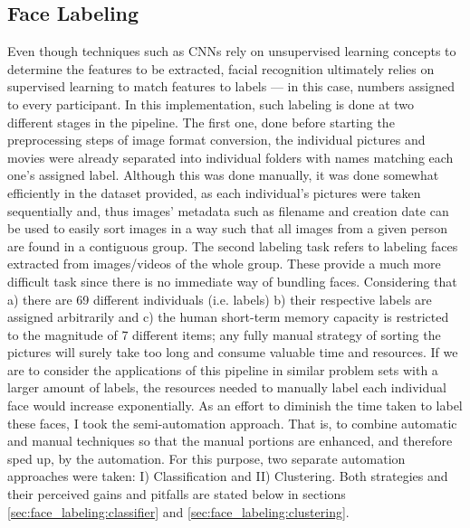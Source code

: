 \documentclass[11pt]{article}
\begin{document}
\subsection{Face Labeling}\label{sec:face_labeling}
    Even though techniques such as CNNs rely on unsupervised learning concepts to determine the features to be extracted, facial recognition ultimately relies on supervised learning to match features to labels --- in this case, numbers assigned to every participant. In this implementation, such labeling is done at two different stages in the pipeline. The first one, done before starting the preprocessing steps of image format conversion, the individual pictures and movies were already separated into individual folders with names matching each one's assigned label. Although this was done manually, it was done somewhat efficiently in the dataset provided, as each individual's pictures were taken sequentially and, thus images' metadata such as filename and creation date can be used to easily sort images in a way such that all images from a given person are found in a contiguous group. The second labeling task refers to labeling faces extracted from images/videos of the whole group. These provide a much more difficult task since there is no immediate way of bundling faces. Considering that a) there are 69 different individuals (i.e. labels) b) their respective labels are assigned arbitrarily and c) the human short-term memory capacity is restricted to the magnitude of 7 different items; any fully manual strategy of sorting the pictures will surely take too long and consume valuable time and resources. If we are to consider the applications of this pipeline in similar problem sets with a larger amount of labels, the resources needed to manually label each individual face would increase exponentially. As an effort to diminish the time taken to label these faces, I took the semi-automation approach. That is, to combine automatic and manual techniques so that the manual portions are enhanced, and therefore sped up, by the automation. For this purpose, two separate automation approaches were taken: I) Classification and II) Clustering. Both strategies and their perceived gains and pitfalls are stated below in sections \ref{sec:face_labeling:classifier} and \ref{sec:face_labeling:clustering}.
\end{document}

